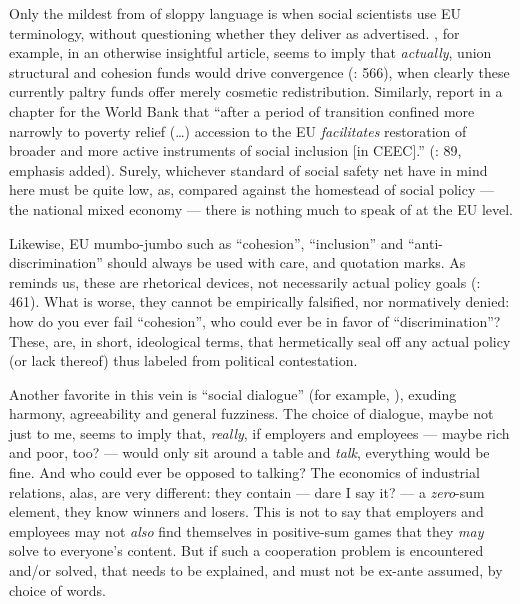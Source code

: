 Only the mildest from of sloppy language is when social scientists use \gls{EU} terminology, without questioning whether they deliver as advertised. \citeauthor{Dehey2003}, for example, in an otherwise insightful article, seems to imply that \emph{actually}, union structural and cohesion funds would drive convergence (\citeyear{Dehey2003}: 566), when clearly these currently paltry funds offer merely cosmetic redistribution. Similarly, \citeauthor{Sipos2005} report in a chapter for the World Bank that ``after a period of transition confined more narrowly to poverty relief (\ldots) accession to the \gls{EU} \emph{facilitates} restoration of broader and more active instruments of social inclusion [in \gls{CEEC}].'' (\citeyear{Sipos2005}: 89, emphasis added). Surely, whichever standard \citeauthor{Sipos2005} of social safety net have in mind here must be quite low, as, compared against the homestead of social policy --- the national mixed economy --- there is nothing much to speak of at the \gls{EU} level.

Likewise, \gls{EU} mumbo-jumbo such as ``cohesion'', ``inclusion'' and ``anti-discrimination'' should always be used with care, and quotation marks. As \citeauthor{Offe2003} reminds us, these are rhetorical devices, not necessarily actual policy goals (\citeyear{Offe2003}: 461). What is worse, they cannot be empirically falsified, nor normatively denied: how do you ever fail ``cohesion'', who could ever be in favor of ``discrimination''? These, are, in short, ideological terms, that hermetically seal off any actual policy (or lack thereof) thus labeled from political contestation.

Another favorite in this vein is ``social dialogue'' (for example, \citealt{Durr2009}), exuding harmony, agreeability and general fuzziness. The choice of dialogue, maybe not just to me, seems to imply that, \emph{really}, if employers and employees --- maybe rich and poor, too? --- would only sit around a table and \emph{talk}, everything would be fine. And who could ever be opposed to talking? The economics of industrial relations, alas, are very different: they contain --- dare I say it? --- a \emph{zero}-sum element, they know winners and losers. This is not to say that employers and employees may not \emph{also} find themselves in positive-sum games that they \emph{may} solve to everyone's content. But if such a cooperation problem is encountered and/or solved, that needs to be explained, and must not be ex-ante assumed, by choice of words.

